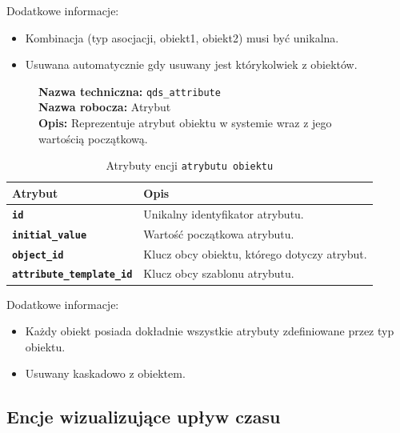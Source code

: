 Dodatkowe informacje:
\begin{itemize}
    \item Kombinacja (typ asocjacji, obiekt1, obiekt2) musi być unikalna.
    \item Usuwana automatycznie gdy usuwany jest którykolwiek z obiektów.
\end{itemize}

\begin{figure}[H]
    \centering
    \begin{minipage}{0.8\textwidth}
        \begin{framed}
            \noindent\textbf{\large Nazwa techniczna:} \texttt{qds\_attribute} \\
            \textbf{\large Nazwa robocza:} Atrybut \\
            \textbf{\large Opis:} Reprezentuje atrybut obiektu w systemie wraz z jego wartością początkową.
        \end{framed}
    \end{minipage}
\end{figure}

\begin{table}[H]
    \centering
    \renewcommand{\arraystretch}{1.6}
    \begin{tabular}{|>{\bfseries}l|p{}|}
        \hline
        \rowcolor[HTML]{EFEFEF} \textbf{Atrybut} & \textbf{Opis} \\
        \hline
        \texttt{id} & Unikalny identyfikator atrybutu. \\
        \hline
        \texttt{initial\_value} & Wartość początkowa atrybutu. \\
        \hline
        \texttt{object\_id} & Klucz obcy obiektu, którego dotyczy atrybut. \\
        \hline
        \texttt{attribute\_template\_id} & Klucz obcy szablonu atrybutu. \\
        \hline
    \end{tabular}
    \caption{Atrybuty encji \texttt{atrybutu obiektu}}
\end{table}

Dodatkowe informacje:
\begin{itemize}
    \item Każdy obiekt posiada dokładnie wszystkie atrybuty zdefiniowane przez typ obiektu.
    \item Usuwany kaskadowo z obiektem.
\end{itemize}

\subsection{Encje wizualizujące upływ czasu}

